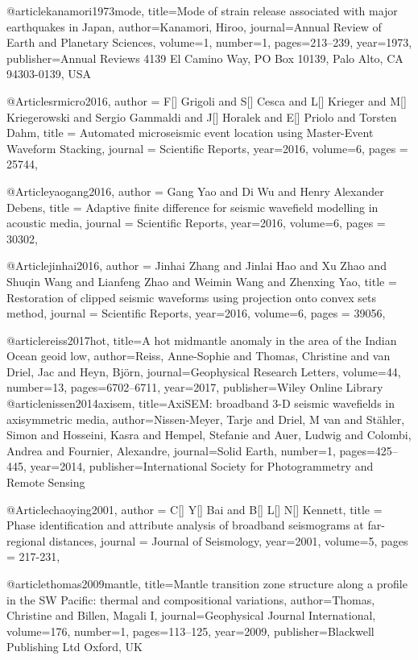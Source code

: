 @article{kanamori1973mode,
  title={Mode of strain release associated with major earthquakes in Japan},
  author={Kanamori, Hiroo},
  journal={Annual Review of Earth and Planetary Sciences},
  volume={1},
  number={1},
  pages={213--239},
  year={1973},
  publisher={Annual Reviews 4139 El Camino Way, PO Box 10139, Palo Alto, CA 94303-0139, USA}
}

@Article{srmicro2016,
  author =	 {F[] Grigoli and S[] Cesca and L[] Krieger and M[] Kriegerowski and Sergio Gammaldi and J[] Horalek and E[] Priolo and Torsten Dahm},
  title =	 {Automated microseismic event location using Master-Event Waveform Stacking},
  journal =	 {Scientific Reports},
  year=2016,
  volume=6,
  pages =	 {25744},
}

@Article{yaogang2016,
  author =	 {Gang Yao and Di Wu and Henry Alexander Debens},
  title =	 {Adaptive finite difference for seismic wavefield modelling in acoustic media},
  journal =	 {Scientific Reports},
  year=2016,
  volume=6,
  pages =	 {30302},
}

@Article{jinhai2016,
  author =	 {Jinhai Zhang and Jinlai Hao and Xu Zhao and Shuqin Wang and Lianfeng Zhao and Weimin Wang and Zhenxing Yao},
  title =	 {Restoration of clipped seismic waveforms using projection onto convex sets method},
  journal =	 {Scientific Reports},
  year=2016,
  volume=6,
  pages =	 {39056},
}

@article{reiss2017hot,
  title={A hot midmantle anomaly in the area of the Indian Ocean geoid low},
  author={Reiss, Anne-Sophie and Thomas, Christine and van Driel, Jac and Heyn, Bj{\"o}rn},
  journal={Geophysical Research Letters},
  volume={44},
  number={13},
  pages={6702--6711},
  year={2017},
  publisher={Wiley Online Library}
}
@article{nissen2014axisem,
  title={AxiSEM: broadband 3-D seismic wavefields in axisymmetric media},
  author={Nissen-Meyer, Tarje and Driel, M van and St{\"a}hler, Simon and Hosseini, Kasra and Hempel, Stefanie and Auer, Ludwig and Colombi, Andrea and Fournier, Alexandre},
  journal={Solid Earth},
  number={1},
  pages={425--445},
  year={2014},
  publisher={International Society for Photogrammetry and Remote Sensing}
}

@Article{chaoying2001,
  author =	 {C[] Y[] Bai and B[] L[] N[] Kennett},
  title =	 {Phase identification and attribute analysis of broadband seismograms at far-regional distances},
  journal =	 {Journal of Seismology},
  year=2001,
  volume=5,
  pages =	 {217-231},
}

@article{thomas2009mantle,
  title={Mantle transition zone structure along a profile in the SW Pacific: thermal and compositional variations},
  author={Thomas, Christine and Billen, Magali I},
  journal={Geophysical Journal International},
  volume={176},
  number={1},
  pages={113--125},
  year={2009},
  publisher={Blackwell Publishing Ltd Oxford, UK}
}




